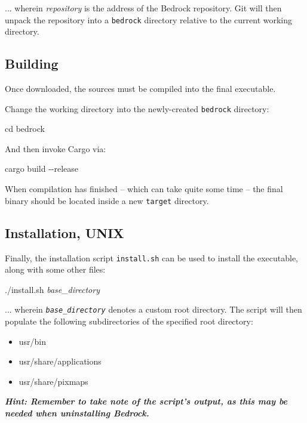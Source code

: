 \documentclass[a5paper, twoside]{report}
\begin{document}
				... wherein \textit{repository} is the address of the Bedrock repository.
				Git will then unpack the repository into a \texttt{bedrock} directory relative to the current working directory.

			\subsection{Building}
				Once downloaded, the sources must be compiled into the final executable.

				Change the working directory into the newly-created \texttt{bedrock} directory:

				\begin{mdframed}
					\ttfamily
					cd bedrock
				\end{mdframed}

				And then invoke Cargo via:

				\begin{mdframed}
					\ttfamily
					cargo build -{}-release
				\end{mdframed}

				When compilation has finished -- which can take quite some time -- the final binary should be located inside a new \texttt{target} directory.

			\subsection{Installation, UNIX\textsuperscript{\textregistered}}
				Finally, the installation script \texttt{install.sh} can be used to install the executable, along with some other files:

				\begin{mdframed}
					\ttfamily
					./install.sh \textit{base\_directory}
				\end{mdframed}

				... wherein \texttt{\itshape base\_directory} denotes a custom root directory.
				The script will then populate the following subdirectories of the specified root directory:

				\begin{itemize}
					\ttfamily

					\item{usr/bin}
					\item{usr/share/applications}
					\item{usr/share/pixmaps}
				\end{itemize}

				\begin{mdframed}
					\small\itshape\bfseries
					Hint: Remember to take note of the script's output, as this may be needed when uninstalling Bedrock.
				\end{mdframed}
\end{document}
